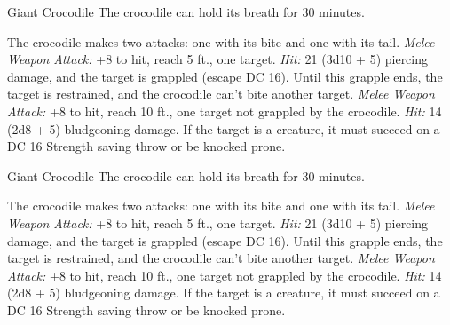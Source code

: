 \documentclass[10pt,a4paper,twoside,twocolumn,openany,bg=print,nodeprecatedcode]{dndbook}
\begin{document}
\begin{DndMonster}[float*=t]{Giant Crocodile}
\DndMonsterBasics[
armor-class = {14 (natural armor)},
hit-points = {\DndDice{9d12 + 27}},
speed = {30 ft., 50 ft. (key)}
]
\DndMonsterAbilityScores[
 str = 21,
 dex = 9,
 con = 17,
 int = 2,
 wis = 10,
 cha = 7
]
\DndMonsterDetails[
skills = {Stealth +5},
challenge = 5,
]
The crocodile can hold its breath for 30 minutes.
\par
{}
The crocodile makes two attacks: one with its bite and one with its tail.
\textsl{Melee Weapon Attack:} +8 to hit, reach 5 ft., one target. \textsl{Hit:} 21 (3d10 + 5) piercing damage, and the target is grappled (escape DC 16). Until this grapple ends, the target is restrained, and the crocodile can't bite another target.
\textsl{Melee Weapon Attack:} +8 to hit, reach 10 ft., one target not grappled by the crocodile. \textsl{Hit:} 14 (2d8 + 5) bludgeoning damage. If the target is a creature, it must succeed on a DC 16 Strength saving throw or be knocked prone.
\end{DndMonster}



\begin{DndMonster}[float*=t]{Giant Crocodile}
\DndMonsterBasics[
armor-class = {14 (natural armor)},
hit-points = {\DndDice{9d12 + 27}},
speed = {30 ft., 50 ft. (key)}
]
\DndMonsterAbilityScores[
 str = 21,
 dex = 9,
 con = 17,
 int = 2,
 wis = 10,
 cha = 7
]
\DndMonsterDetails[
skills = {Stealth +5},
challenge = 5,
]
The crocodile can hold its breath for 30 minutes.
\par
{}
The crocodile makes two attacks: one with its bite and one with its tail.
\textsl{Melee Weapon Attack:} +8 to hit, reach 5 ft., one target. \textsl{Hit:} 21 (3d10 + 5) piercing damage, and the target is grappled (escape DC 16). Until this grapple ends, the target is restrained, and the crocodile can't bite another target.
\textsl{Melee Weapon Attack:} +8 to hit, reach 10 ft., one target not grappled by the crocodile. \textsl{Hit:} 14 (2d8 + 5) bludgeoning damage. If the target is a creature, it must succeed on a DC 16 Strength saving throw or be knocked prone.
\end{DndMonster}
\end{document}

